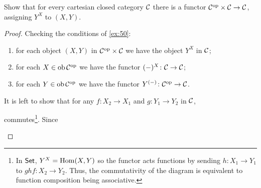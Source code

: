 \begin{exercise}{52}
    Show that for every cartesian closed category $\mathcal{C}$ there is a functor $\mathcal{C}^{\text{op}}\times\mathcal{C}\to\mathcal{C}$, assigning $Y^X$ to $(X,Y)$.
\end{exercise}
\begin{solution}
    \begin{proof}
        Checking the conditions of \ref{ex:50}:
        \begin{enumerate}
            \item for each object $(X,Y)$ in $\mathcal{C}^{\text{op}}\times\mathcal{C}$ we have the object $Y^X$ in $\mathcal{C}$;
            \item for each $X\in\operatorname{ob}\mathcal{C}^{\text{op}}$ we have the functor $(-)^X\colon\mathcal{C}\to\mathcal{C}$;
            \item for each $Y\in\operatorname{ob}\mathcal{C}^{\text{op}}$ we have the functor $Y^{(-)}\colon\mathcal{C}^{\text{op}}\to\mathcal{C}$.
        \end{enumerate}
        It is left to show that for any $f\colon X_2\to X_1$ and $g\colon Y_1\to Y_2$ in $\mathcal{C}$,
        \begin{center}
        \end{center}
        commutes\footnote{
            In $\normalfont\mathsf{Set}$, $Y^X=\operatorname{Hom}(X,Y)$ so the functor acts functions by sending $h\colon X_1\to Y_1$ to $ghf\colon X_2\to Y_2$. 
            Thus, the commutativity of the diagram is equivalent to function composition being associative.
        }. Since
        \begin{center}
        \end{center}

\end{proof}
\end{solution}
